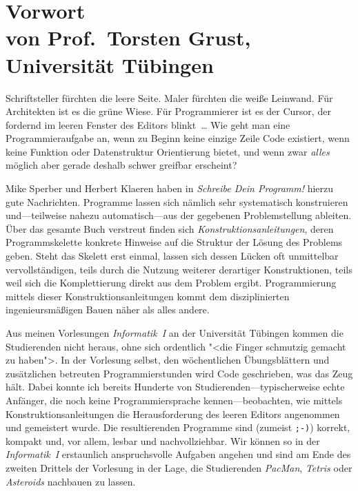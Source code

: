 
\chapter*{Vorwort\\
\normalsize von Prof.\ Torsten Grust, Universität Tübingen}
\thispagestyle{empty}


Schriftsteller fürchten die leere Seite.  Maler fürchten die weiße
Leinwand.  Für Architekten ist es die grüne Wiese.  Für Programmierer
ist es der Cursor, der fordernd im leeren Fenster des Editors
blinkt~\ldots{} Wie geht man eine Programmieraufgabe an, wenn zu Beginn
keine einzige Zeile Code existiert, wenn keine Funktion oder
Datenstruktur Orientierung bietet, und wenn zwar \emph{alles} möglich
aber gerade deshalb schwer greifbar erscheint?

Mike Sperber und Herbert Klaeren haben in \textit{Schreibe Dein
Programm!} hierzu gute Nachrichten.  Programme lassen sich nämlich sehr
systematisch konstruieren und---teilweise nahezu auto\-ma\-tisch---aus der
gegebenen Problemstellung ableiten.  Über das gesamte Buch verstreut
finden sich \textit{Konstruktionsanleitungen}, deren Programmskelette
konkrete Hinweise auf die Struktur der Lösung des Problems geben.  Steht
das Skelett erst einmal, lassen sich dessen Lücken oft unmittelbar
vervollständigen, teils durch die Nutzung weiterer derartiger
Konstruktionen, teils weil sich die Komplettierung direkt aus dem
Problem ergibt.  Programmierung mittels dieser Konstruktions\-anleitungen
kommt dem disziplinierten ingenieursmäßigen Bauen näher als alles
andere.

Aus meinen Vorlesungen \textit{Informatik~I} an der Universität Tübingen
kommen die Studierenden nicht heraus, ohne sich ordentlich "<die Finger
schmutzig gemacht zu haben">.  In der Vor\-lesung selbst, den
wöchentlichen Übungsblättern und zusätzlichen betreuten
Programmierstunden wird Code geschrieben, was das Zeug hält.  Dabei
konnte ich bereits Hunderte von Studierenden---typischerweise echte
Anfänger, die noch keine Programmiersprache kennen---beobachten, wie
mittels Konstruktionsanleitungen die Herausforderung des leeren Editors
angenommen und gemeistert wurde.  Die resultierenden Programme sind
(zumeist \texttt{;-)}) korrekt, kompakt und, vor allem, lesbar und
nachvollziehbar.  Wir können so in der \textit{Informatik~I} erstaunlich
anspruchsvolle Auf\-gaben angehen und sind am Ende des zweiten
Drittels der Vorlesung in der Lage, die Studierenden \textit{PacMan},
\textit{Tetris} oder \textit{Asteroids} nachbauen zu lassen.

